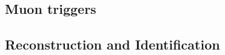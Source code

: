 \subsection{Muon triggers}
\label{sec:reco-mu-triggers}

\subsection{Reconstruction and Identification}
\label{sec:reco-el-reco}
